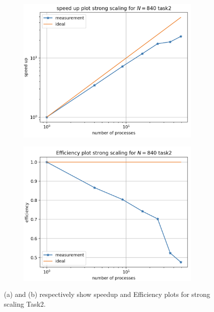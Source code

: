 \documentclass[12pt,a4paper]{article}
\begin{document}
\begin{enumerate}
		\begin{figure}[h]
			\begin{subfigure}[b]{0.5\textwidth}
				\centering
				\includegraphics[width=1.0\linewidth]{"speedup"}
				\caption{}
				\label{fig:speedup_task2}
			\end{subfigure}
			\begin{subfigure}[b]{0.5\textwidth}
				\centering
					\includegraphics[width=1.0\linewidth]{"eff_t2"}
				\caption{}
				\label{fig:efficiency_task2}
			\end{subfigure}
		\caption{(a) and (b) respectively show speedup and Efficiency plots for strong scaling Task2. }
		\end{figure}
		
	\end{enumerate}
	
\end{document}
